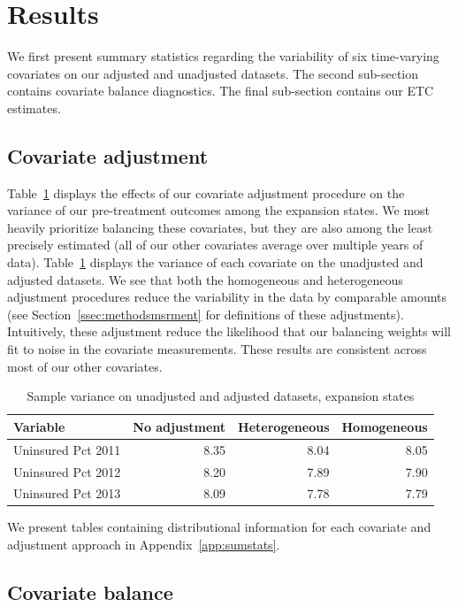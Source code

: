 \documentclass[aoas]{imsart}
\theoremstyle{plain}
\theoremstyle{remark}
\begin{document}
\section{Results}\label{sec:results}

We first present summary statistics regarding the variability of six time-varying covariates on our adjusted and unadjusted datasets. The second sub-section contains covariate balance diagnostics. The final sub-section contains our ETC estimates.

\subsection{Covariate adjustment}

Table~\ref{tab:adjust1} displays the effects of our covariate adjustment procedure on the variance of our pre-treatment outcomes among the expansion states. We most heavily prioritize balancing these covariates, but they are also among the least precisely estimated (all of our other covariates average over multiple years of data). Table~\ref{tab:adjust1} displays the variance of each covariate on the unadjusted and adjusted datasets. We see that both the homogeneous and heterogeneous adjustment procedures reduce the variability in the data by comparable amounts (see Section~\ref{ssec:methodsmsrment} for definitions of these adjustments). Intuitively, these adjustment reduce the likelihood that our balancing weights will fit to noise in the covariate measurements. These results are consistent across most of our other covariates.

\begin{table}[ht]
\caption{Sample variance on unadjusted and adjusted datasets, expansion states}\label{tab:adjust1}
\begin{tabular}{lrrr}
  \hline
Variable & No adjustment & Heterogeneous & Homogeneous \\ 
  \hline
Uninsured Pct 2011 & 8.35 & 8.04 & 8.05 \\ 
  Uninsured Pct 2012 & 8.20 & 7.89 & 7.90 \\ 
  Uninsured Pct 2013 & 8.09 & 7.78 & 7.79 \\ 
   \hline
\end{tabular}
\end{table}

We present tables containing distributional information for each covariate and adjustment approach in Appendix~\ref{app:sumstats}. 

\subsection{Covariate balance}
\end{document}
